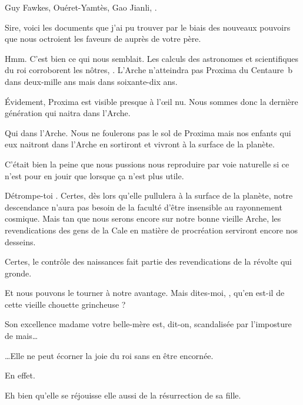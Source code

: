 \begin{drama}

  \elenaspeaks Guy Fawkes, Ouéret-Yamtès, Gao Jianli, \general. %

  \intrat{\alexas}

  \alexasspeaks Sire, voici les documents que j’ai pu trouver par le biais des nouveaux pouvoirs que nous octroient les faveurs de \ela auprès de votre père.

  \elenaspeaks {} Hmm.  C’est bien ce qui nous semblait. Les calculs des astronomes et scientifiques du roi corroborent les nôtres, \alexas{}. L’Arche n’atteindra pas Proxima du Centaure~b dans deux-mille ans mais dans soixante-dix ans.

  \alexasspeaks Évidement, Proxima est visible presque à l’œil nu. Nous sommes donc la dernière génération qui naitra dans l’Arche.

  \elenaspeaks Qui  dans l’Arche. Nous ne foulerons pas le sol de Proxima mais nos enfants qui eux naitront dans l’Arche en sortiront et vivront à la surface de la planète.

  \alexasspeaks C’était bien la peine que nous pussions nous reproduire par voie naturelle si ce n’est pour en jouir que lorsque ça n’est plus utile.

  \elenaspeaks Détrompe-toi \alexas. Certes, dès lors qu’elle pullulera à la surface de la planète, notre descendance n’aura pas besoin de la faculté d’être insensible au rayonnement cosmique. Mais tan que nous serons encore sur notre bonne vieille Arche, les revendications des gens de la Cale en matière de procréation serviront encore nos desseins.

  \alexasspeaks Certes, le contrôle des naissances fait partie des revendications de la révolte qui gronde.

  \elenaspeaks Et nous pouvons le tourner à notre avantage. Mais dites-moi, \alexas{}, qu’en est-il de cette vieille chouette grincheuse ?

  \alexasspeaks Son excellence madame votre belle-mère est, dit-on, scandalisée par l’imposture de \ela mais…

  \elenaspeaks …Elle ne peut écorner la joie du roi sans en être encornée.

  \alexasspeaks {} En effet.

  \elenaspeaks Eh bien qu’elle se réjouisse elle aussi de la résurrection de sa fille.


\end{drama}
